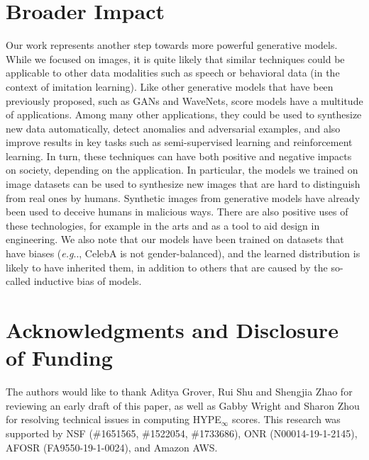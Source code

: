 \documentclass{article}
\makeatletter
\def\@onedot{\ifx\@let@token.\else.\null\fi\xspace}
\DeclareRobustCommand\onedot{\futurelet\@let@token\@onedot}
\def\eg{\emph{e.g}\onedot}
\makeatother
\begin{document}
\section*{Broader Impact}
Our work represents another step towards more powerful generative models. While we focused on images, it is quite likely that similar techniques could be applicable to other data modalities such as speech or behavioral data (in the context of imitation learning). Like other generative models that have been previously proposed, such as GANs and WaveNets, score models have a multitude of applications. Among many other applications, they could be used to synthesize new data automatically, detect anomalies and adversarial examples, and also improve results in key tasks such as semi-supervised learning and reinforcement learning. In turn, these techniques can have both positive and negative impacts on society, depending on the application. In particular, the models we trained on image datasets can be used to synthesize new images that are hard to distinguish from real ones by humans. Synthetic images from generative models have already been used to deceive humans in malicious ways. There are also positive uses of these technologies, for example in the arts and as a tool to aid design in engineering. We also note that our models have been trained on datasets that have biases (\eg, CelebA is not gender-balanced), and the learned distribution is likely to have inherited them, in addition to others that are caused by the so-called inductive bias of models.

\section*{Acknowledgments and Disclosure of Funding}
The authors would like to thank Aditya Grover, Rui Shu and Shengjia Zhao for reviewing an early draft of this paper, as well as Gabby Wright and Sharon Zhou for resolving technical issues in computing HYPE$_\infty$ scores. This research was supported by NSF (\#1651565, \#1522054, \#1733686), ONR  (N00014-19-1-2145), AFOSR (FA9550-19-1-0024), and Amazon AWS. 




\clearpage
\appendix
\end{document}
